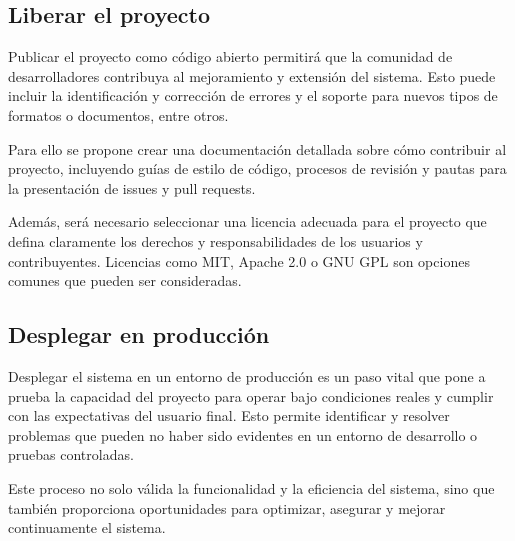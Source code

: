\subsection{Liberar el proyecto}

Publicar el proyecto como código abierto permitirá que la comunidad de desarrolladores contribuya al mejoramiento y
extensión del sistema.
Esto puede incluir la identificación y corrección de errores y el soporte para nuevos tipos de formatos o documentos,
entre otros.

Para ello se propone crear una documentación detallada sobre cómo contribuir al proyecto, incluyendo guías de estilo
de código, procesos de revisión y pautas para la presentación de issues y pull requests.

Además, será necesario seleccionar una licencia adecuada para el proyecto que defina claramente los derechos y
responsabilidades de los usuarios y contribuyentes.
Licencias como MIT, Apache 2.0 o GNU GPL son opciones comunes que pueden ser consideradas.

\subsection{Desplegar en producción}

Desplegar el sistema en un entorno de producción es un paso vital que pone a prueba la capacidad del proyecto para
operar bajo condiciones reales y cumplir con las expectativas del usuario final.
Esto permite identificar y resolver problemas que pueden no haber sido evidentes en un entorno de desarrollo o
pruebas controladas.

Este proceso no solo válida la funcionalidad y la eficiencia del sistema, sino que también proporciona oportunidades
para optimizar, asegurar y mejorar continuamente el sistema.